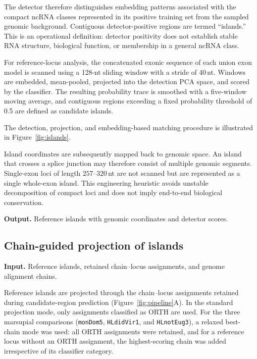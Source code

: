 The detector therefore distinguishes embedding patterns associated with the
compact ncRNA classes represented in its positive training set from the sampled
genomic background. Contiguous detector-positive regions are termed
``islands.'' This is an operational definition: detector positivity does not
establish stable RNA structure, biological function, or membership in a general
ncRNA class.

For reference-locus analysis, the concatenated exonic sequence of each union
exon model is scanned using a 128-nt sliding window with a stride of 40\,nt.
Windows are embedded, mean-pooled, projected into the detection PCA space, and
scored by the classifier. The resulting probability trace is smoothed with a
five-window moving average, and contiguous regions exceeding a fixed probability
threshold of 0.5 are defined as candidate islands.

The detection, projection, and embedding-based matching procedure is illustrated
in Figure~\ref{fig:islands}.

Island coordinates are subsequently mapped back to genomic space. An island
that crosses a splice junction may therefore consist of multiple genomic
segments. Single-exon loci of length $257$--$320$\,nt are not scanned but are
represented as a single whole-exon island. This engineering heuristic avoids
unstable decomposition of compact loci and does not imply end-to-end biological
conservation.

\textbf{Output.} Reference islands with genomic coordinates and detector scores.

\subsection{Chain-guided projection of islands}
\label{sec:projisland}

\textbf{Input.} Reference islands, retained chain--locus assignments, and genome
alignment chains.

Reference islands are projected through the chain--locus assignments retained
during candidate-region prediction
(Figure~\ref{fig:pipeline}A). In the standard projection mode, only assignments
classified as ORTH are used. For the three marsupial comparisons
(\texttt{monDom5}, \texttt{HLdidVir1}, and \texttt{HLnotEug3}), a relaxed
best-chain mode was used: all ORTH assignments were retained, and for a reference
locus without an ORTH assignment, the highest-scoring chain was added
irrespective of its classifier category.

